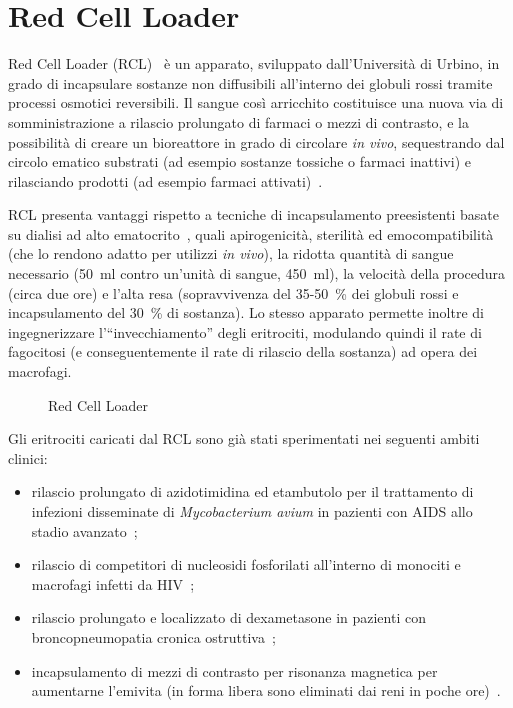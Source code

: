 	\section{Red Cell Loader}\label{sez:rcl}
		Red Cell Loader (RCL)~\cite{magnani1998erythrocyte} \`e un apparato, sviluppato dall'Universit\`a di Urbino, in grado di incapsulare sostanze non diffusibili all'interno dei globuli rossi tramite processi osmotici reversibili.
		Il sangue cos\`i arricchito costituisce una nuova via di somministrazione a rilascio prolungato di farmaci o mezzi di contrasto, e la possibilit\`a di creare un bioreattore in grado di circolare \emph{in vivo}, sequestrando dal circolo ematico substrati (ad esempio sostanze tossiche o farmaci inattivi) e rilasciando prodotti (ad esempio farmaci attivati)~\cite{biagiotti2011drug,magnani2012erythrocytes,rossi2005erythrocyte}.
		
		RCL presenta vantaggi rispetto a tecniche di incapsulamento preesistenti basate su dialisi ad alto ematocrito~\cite{hamarat2000encapsulation}, quali apirogenicit\`a, sterilit\`a ed emocompatibilit\`a (che lo rendono adatto per utilizzi \emph{in vivo}), la ridotta quantit\`a di sangue necessario (\SI{50}{ml} contro un'unit\`a di sangue, \SI{450}{ml}), la velocit\`a della procedura (circa due ore) e l'alta resa (sopravvivenza del 35-\SI{50}{\percent} dei globuli rossi e incapsulamento del \SI{30}{\percent} di sostanza).
		Lo stesso apparato permette inoltre di ingegnerizzare l'``invecchiamento'' degli eritrociti, modulando quindi il rate di fagocitosi (e conseguentemente il rate di rilascio della sostanza) ad opera dei macrofagi.
		
		\begin{figure}
			\centerline{}
			\caption{Red Cell Loader}
			\label{fig:rcl}
		\end{figure}
		
		Gli eritrociti caricati dal RCL sono gi\`a stati sperimentati nei seguenti ambiti clinici:
		\begin{itemize}
			\item rilascio prolungato di azidotimidina ed etambutolo per il trattamento di infezioni disseminate di \emph{Mycobacterium avium} in pazienti con AIDS allo stadio avanzato~\cite{magnani1996synthesis,rossi1999heterodimer};
			\item rilascio di competitori di nucleosidi fosforilati all'interno di monociti e macrofagi infetti da HIV~\cite{magnani1992targeting};
			\item rilascio prolungato e localizzato di dexametasone in pazienti con broncopneumopatia cronica ostruttiva~\cite{rossi2001erythrocyte};
			\item incapsulamento di mezzi di contrasto per risonanza magnetica per aumentarne l'emivita (in forma libera sono eliminati dai reni in poche ore)~\cite{antonelli2011encapsulation}.
		\end{itemize}
		
